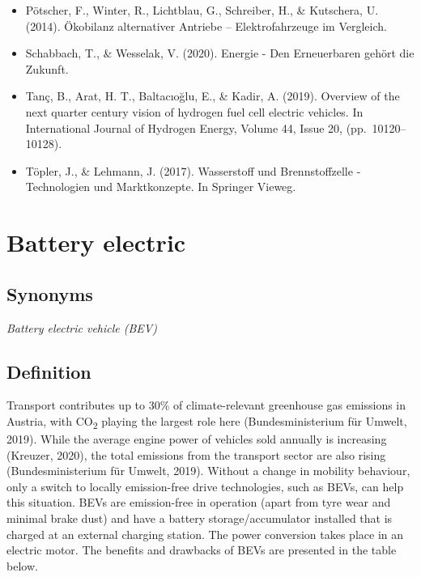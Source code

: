 \documentclass[
]{book}
\begin{document}
\begin{itemize}
\item
  Pötscher, F., Winter, R., Lichtblau, G., Schreiber, H., \& Kutschera, U. (2014). Ökobilanz alternativer Antriebe -- Elektrofahrzeuge im Vergleich.
\item
  Schabbach, T., \& Wesselak, V. (2020). Energie - Den Erneuerbaren gehört die Zukunft.
\item
  Tanç, B., Arat, H. T., Baltacıoğlu, E., \& Kadir, A. (2019). Overview of the next quarter century vision of hydrogen fuel cell electric vehicles. In International Journal of Hydrogen Energy, Volume 44, Issue 20, (pp.~10120--10128).
\item
  Töpler, J., \& Lehmann, J. (2017). Wasserstoff und Brennstoffzelle - Technologien und Marktkonzepte. In Springer Vieweg.
\end{itemize}

\hypertarget{bev}{%
\section{Battery electric}\label{bev}}

\hypertarget{synonyms-32}{%
\subsection*{Synonyms}\label{synonyms-32}}

\emph{Battery electric vehicle (BEV)}

\hypertarget{definition-36}{%
\subsection*{Definition}\label{definition-36}}

Transport contributes up to 30\% of climate-relevant greenhouse gas emissions in Austria, with CO\textsubscript{2} playing the largest role here (Bundesministerium für Umwelt, 2019). While the average engine power of vehicles sold annually is increasing (Kreuzer, 2020), the total emissions from the transport sector are also rising (Bundesministerium für Umwelt, 2019). Without a change in mobility behaviour, only a switch to locally emission-free drive technologies, such as BEVs, can help this situation.
BEVs are emission-free in operation (apart from tyre wear and minimal brake dust) and have a battery storage/accumulator installed that is charged at an external charging station. The power conversion takes place in an electric motor. The benefits and drawbacks of BEVs are presented in the table below.
\end{document}
